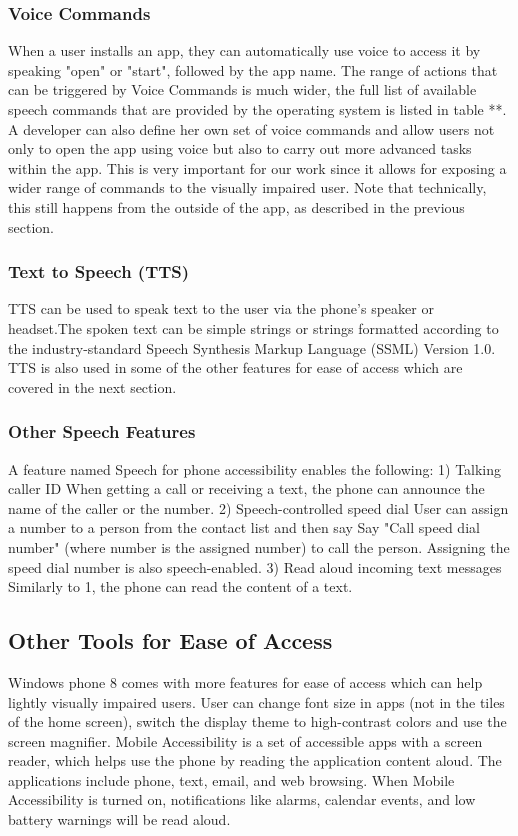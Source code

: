 \subsubsection{Voice Commands}
When a user installs an app, they can automatically use voice to access it by speaking "open" or "start", followed by the app name. The range of actions that can be triggered by Voice Commands is much wider, the full list of available speech commands that are provided by the operating system is listed in table **.
A developer can also define her own set of voice commands and allow users not only to open the app using voice but also to carry out more advanced tasks within the app. This is very important for our work since it allows for exposing a wider range of commands to the visually impaired user. Note that technically, this still happens from the outside of the app, as described in the previous section.

\subsubsection{Text to Speech (TTS)}
TTS can be used to speak text to the user via the phone's speaker or headset.The spoken text can be simple strings or strings formatted according to the industry-standard Speech Synthesis Markup Language (SSML) Version 1.0. TTS is also used in some of the other features for ease of access which are covered in the next section.

\subsubsection{Other Speech Features}
A feature named Speech for phone accessibility enables the following:
1)	Talking caller ID
When getting a call or receiving a text, the phone can announce the name of the caller or the number. 
2)	Speech-controlled speed dial
User can assign a number to a person from the contact list and then say Say "Call speed dial number" (where number is the assigned number) to call the person. Assigning the speed dial number is also speech-enabled.
3)	Read aloud incoming text messages
Similarly to 1, the phone can read the content of a text.

\subsection{Other Tools for Ease of Access}
Windows phone 8 comes with more features for ease of access which can help lightly visually impaired users. User can change font size in apps (not in the tiles of the home screen), switch the display theme to high-contrast colors and use the screen magnifier. Mobile Accessibility is a set of accessible apps with a screen reader, which helps use the phone by reading the application content aloud. The applications include phone, text, email, and web browsing. When Mobile Accessibility is turned on, notifications like alarms, calendar events, and low battery warnings will be read aloud. 

\endinput
